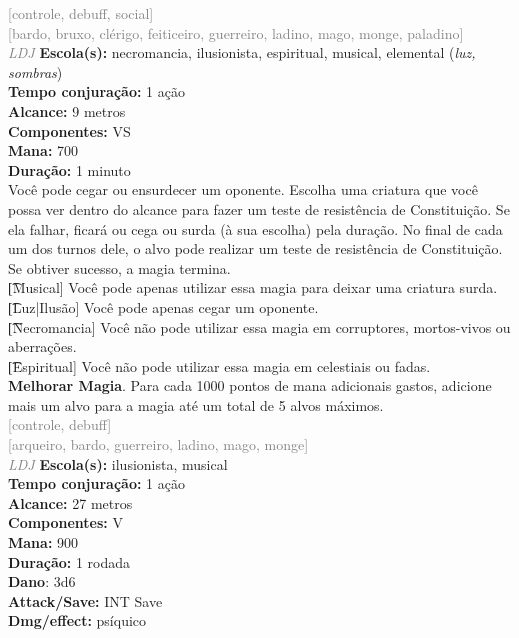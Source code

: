 \documentclass{RPG_Adventure}[2021/10/20]
\begin{document}
{\scriptsize \textcolor{gray}{[controle, debuff, social]\\}}
{\scriptsize \textcolor{gray}{[bardo, bruxo, clérigo, feiticeiro, guerreiro, ladino, mago, monge, paladino]\\}}
{\tiny \textcolor{gray}{\textit{LDJ}}}\jump{}
{\small \t \textbf{Escola(s):} necromancia, ilusionista, espiritual, musical, elemental (\textit{luz, sombras})\\\t \textbf{Tempo conjuração:} 1 ação\\\t \textbf{Alcance:} 9 metros\\\t \textbf{Componentes:} VS\\\t \textbf{Mana:} 700\\\t \textbf{Duração:} 1 minuto\\}
{\normalsize Você pode cegar ou ensurdecer um oponente. Escolha uma criatura que você possa ver dentro do alcance para fazer um teste de resistência de Constituição. Se ela falhar, ficará ou cega ou surda (à sua escolha) pela duração. No final de cada um dos turnos dele, o alvo pode realizar um teste de resistência de Constituição. Se obtiver sucesso, a magia termina.\\\t [Musical] Você pode apenas utilizar essa magia para deixar uma criatura surda.\\\t [Luz|Ilusão] Você pode apenas cegar um oponente.\\\t [Necromancia] Você não pode utilizar essa magia em corruptores, mortos-vivos ou aberrações.\\\t [Espiritual] Você não pode utilizar essa magia em celestiais ou fadas.\\\t \textbf{Melhorar Magia}. Para cada 1000 pontos de mana adicionais gastos, adicione mais um alvo para a magia até um total de 5 alvos máximos.\\}
{\scriptsize \textcolor{gray}{[controle, debuff]\\}}
{\scriptsize \textcolor{gray}{[arqueiro, bardo, guerreiro, ladino, mago, monge]\\}}
{\tiny \textcolor{gray}{\textit{LDJ}}}\jump{}
{\small \t \textbf{Escola(s):} ilusionista, musical\\\t \textbf{Tempo conjuração:} 1 ação\\\t \textbf{Alcance:} 27 metros\\\t \textbf{Componentes:} V\\\t \textbf{Mana:} 900\\\t \textbf{Duração:} 1 rodada\\\t \textbf{Dano}: 3d6\\\t \textbf{Attack/Save:} INT Save\\\t \textbf{Dmg/effect:} psíquico\\}
\end{document}
